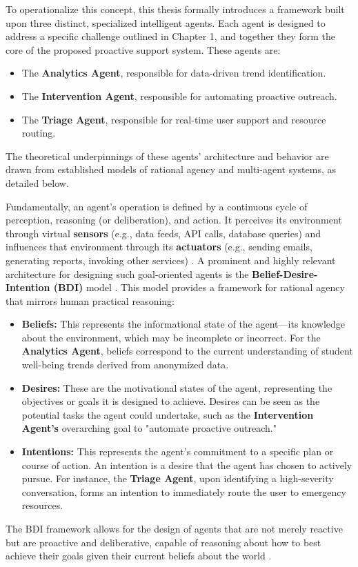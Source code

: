 To operationalize this concept, this thesis formally introduces a framework built upon three distinct, specialized intelligent agents. Each agent is designed to address a specific challenge outlined in Chapter 1, and together they form the core of the proposed proactive support system. These agents are:
\begin{itemize}
    \item The \textbf{Analytics Agent}, responsible for data-driven trend identification.
    \item The \textbf{Intervention Agent}, responsible for automating proactive outreach.
    \item The \textbf{Triage Agent}, responsible for real-time user support and resource routing.
\end{itemize}
The theoretical underpinnings of these agents' architecture and behavior are drawn from established models of rational agency and multi-agent systems, as detailed below.

Fundamentally, an agent's operation is defined by a continuous cycle of perception, reasoning (or deliberation), and action. It perceives its environment through virtual \textbf{sensors} (e.g., data feeds, API calls, database queries) and influences that environment through its \textbf{actuators} (e.g., sending emails, generating reports, invoking other services) \cite{FIND_CITATION_PLEASE}. A prominent and highly relevant architecture for designing such goal-oriented agents is the \textbf{Belief-Desire-Intention (BDI)} model \cite{FIND_CITATION_PLEASE}. This model provides a framework for rational agency that mirrors human practical reasoning:
\begin{itemize}
    \item \textbf{Beliefs:} This represents the informational state of the agent—its knowledge about the environment, which may be incomplete or incorrect. For the \textbf{Analytics Agent}, beliefs correspond to the current understanding of student well-being trends derived from anonymized data.
    \item \textbf{Desires:} These are the motivational states of the agent, representing the objectives or goals it is designed to achieve. Desires can be seen as the potential tasks the agent could undertake, such as the \textbf{Intervention Agent's} overarching goal to "automate proactive outreach."
    \item \textbf{Intentions:} This represents the agent's commitment to a specific plan or course of action. An intention is a desire that the agent has chosen to actively pursue. For instance, the \textbf{Triage Agent}, upon identifying a high-severity conversation, forms an intention to immediately route the user to emergency resources.
\end{itemize}
The BDI framework allows for the design of agents that are not merely reactive but are proactive and deliberative, capable of reasoning about how to best achieve their goals given their current beliefs about the world \cite{FIND_CITATION_PLEASE}.

